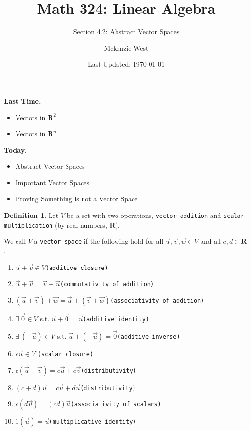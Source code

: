 \documentclass{beamer}
\newcommand{\R}{\mathbf{R}}
\newcommand{\fn}{\insertframenumber}
\theoremstyle{definition}
\newtheorem*{defn}{Definition}
\renewcommand{\emph}[1]{{\color{blue}\texttt{#1}}}
\begin{document}
	\title{Math 324: Linear Algebra}
	\subtitle{Section 4.2: Abstract Vector Spaces}
	\author{Mckenzie West}
	\date{Last Updated: \today}
\begin{frame}
\maketitle
\end{frame}

\begin{frame}{\insertframenumber}
	\begin{block}{\textbf{Last Time.}}
	\begin{itemize}[label=--]
		\item Vectors in $\R^2$
		\item Vectors in $\R^n$
	\end{itemize}
	\end{block}
	\begin{block}{\textbf{Today.}}
		\begin{itemize}[label=--]
			\item Abstract Vector Spaces
			\item Important Vector Spaces
			\item Proving Something is not a Vector Space
		\end{itemize}
	\end{block}
\end{frame}
\begin{frame}{\fn}
	\begin{defn}
		Let $V$ be a set with two operations, \emph{vector addition} and \emph{scalar multiplication} (by real numbers, $\R$).
		
		We call $V$ a \emph{vector space} if the following hold for all $\vec u,\vec v,\vec w\in V$ and all $c,d\in\R$:
			\begin{enumerate}[label=\textbf{\arabic*.}]
				\item $\vec{u}+\vec v\in V$\hfill \emph{(additive closure)}
				\item $\vec u+\vec v=\vec v+\vec u$\hfill \emph{(commutativity of addition)}
				\item $(\vec u +\vec v)+\vec w = \vec u+(\vec v + \vec w)$\hfill\emph{(associativity of addition)}
				\item $\exists\ \vec 0\in V$ s.t. $\vec u +\vec 0= \vec u$\hfill\emph{(additive identity)}
				\item $\exists\ (-\vec u)\in V$ s.t. $\vec u+(-\vec u)=\vec 0$\hfill\emph{(additive inverse)}
				\item $c\vec u\in V$ \hfill\emph{(scalar closure)}
				\item $c(\vec u+\vec v)=c\vec u+c\vec v$\hfill\emph{(distributivity)}
				\item $(c+d)\vec u = c\vec u + d\vec u$\hfill\emph{(distributivity)}
				\item $c(d\vec u)=(cd)\vec u$\hfill \hfill\emph{(associativity of scalars)}
				\item $1(\vec u)=\vec u$\hfill \emph{(multiplicative identity)}
			\end{enumerate}
	\end{defn}
\end{frame}
\end{document}
